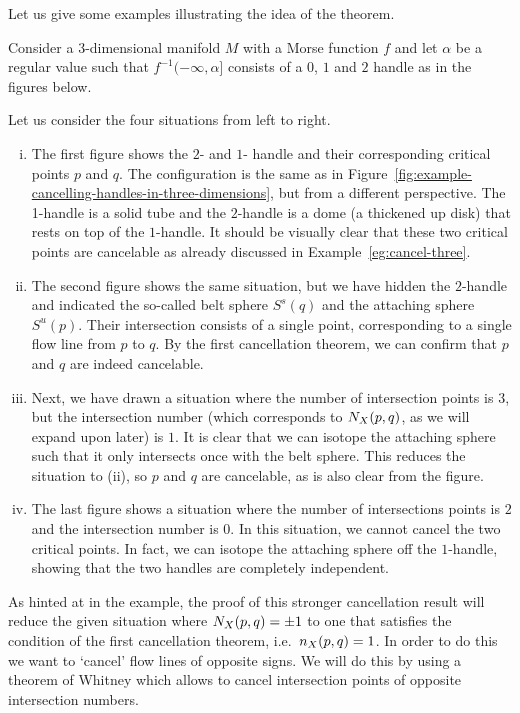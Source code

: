 Let us give some examples illustrating the idea of the theorem.
\begin{eg}
    Consider a $3$-dimensional manifold $M$ with a Morse function $f$ and let $\alpha$ be a regular value such that  $f^{-1}(-\infty, \alpha]$ consists of a $0$, $1$ and  $2$ handle as in the figures below.
    \begin{figure}[H]
    \centering
\end{figure}
    Let us consider the four situations from left to right.
    \begin{enumerate}[(i)]
        \item The first figure shows the $2$- and  $1$- handle and their corresponding critical points $p$ and  $q$.
            The configuration is the same as in Figure~\ref{fig:example-cancelling-handles-in-three-dimensions}, but from a different perspective.
            The 1-handle is a solid tube and the $2$-handle is a dome (a thickened up disk) that rests on top of the $1$-handle.
            It should be visually clear that these two critical points are cancelable as already discussed in Example~\ref{eg:cancel-three}.

        \item The second figure shows the same situation, but we have hidden the $2$-handle and indicated the so-called belt sphere $S^{s}(q)$ and the attaching sphere $S^{u}(p)$. Their intersection consists of a single point, corresponding to a single flow line from $p$ to $q$. 
            By the first cancellation theorem, we can confirm that $p$ and  $q$ are indeed cancelable.
        \item Next, we have drawn a situation where the number of intersection points is $3$, but the intersection number (which corresponds to $N_{X}(p, q)$, as we will expand upon later) is $1$. It is clear that we can isotope the attaching sphere such that it only intersects once with the belt sphere.
            This reduces the situation to (ii), so $p$ and  $q$ are cancelable, as is also clear from the figure. 
        \item The last figure shows a situation where the number of intersections points is $2$ and the intersection number is $0$. In this situation, we cannot cancel the two critical points. In fact, we can isotope the attaching sphere off the $1$-handle, showing that the two handles are completely independent.
    \end{enumerate}
\end{eg}
As hinted at in the example, the proof of this stronger cancellation result will reduce the given situation where $N_{X}(p, q) = \pm 1$ to one that satisfies the condition of the first cancellation theorem, i.e.\ $n_{X}(p, q) = 1$.
In order to do this we want to `cancel' flow lines of opposite signs.
We will do this by using a theorem of Whitney which allows to cancel intersection points of opposite intersection numbers.

